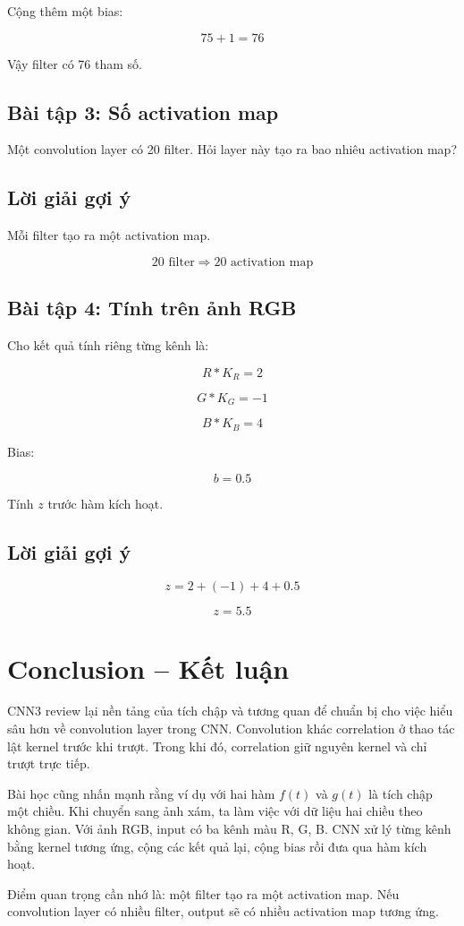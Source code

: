 Cộng thêm một bias:

\[
    75+1=76
\]

Vậy filter có 76 tham số.

\subsection*{Bài tập 3: Số activation map}

Một convolution layer có 20 filter. Hỏi layer này tạo ra bao nhiêu activation map?

\subsection*{Lời giải gợi ý}

Mỗi filter tạo ra một activation map.

\[
    20 \text{ filter}
    \Rightarrow
    20 \text{ activation map}
\]

\subsection*{Bài tập 4: Tính trên ảnh RGB}

Cho kết quả tính riêng từng kênh là:

\[
    R*K_R=2
\]

\[
    G*K_G=-1
\]

\[
    B*K_B=4
\]

Bias:

\[
    b=0.5
\]

Tính $z$ trước hàm kích hoạt.

\subsection*{Lời giải gợi ý}

\[
    z=2+(-1)+4+0.5
\]

\[
    z=5.5
\]

\section*{Conclusion -- Kết luận}

CNN3 review lại nền tảng của tích chập và tương quan để chuẩn bị cho việc hiểu sâu hơn về convolution layer trong CNN. Convolution khác correlation ở thao tác lật kernel trước khi trượt. Trong khi đó, correlation giữ nguyên kernel và chỉ trượt trực tiếp.

Bài học cũng nhấn mạnh rằng ví dụ với hai hàm $f(t)$ và $g(t)$ là tích chập một chiều. Khi chuyển sang ảnh xám, ta làm việc với dữ liệu hai chiều theo không gian. Với ảnh RGB, input có ba kênh màu R, G, B. CNN xử lý từng kênh bằng kernel tương ứng, cộng các kết quả lại, cộng bias rồi đưa qua hàm kích hoạt.

Điểm quan trọng cần nhớ là: một filter tạo ra một activation map. Nếu convolution layer có nhiều filter, output sẽ có nhiều activation map tương ứng.